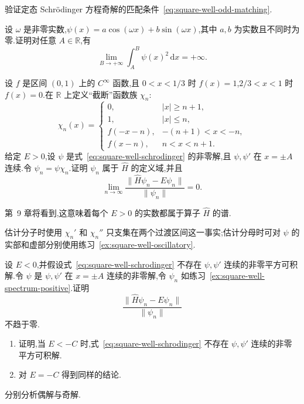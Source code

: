\begin{exercise}\label{ex:square-well-odd-matching}
验证定态 Schrödinger 方程奇解的匹配条件~\eqref{eq:square-well-odd-matching}.
\end{exercise}

\begin{exercise}\label{ex:square-well-oscillatory}
设 \(\omega\) 是非零实数,\(\psi(x)=a\cos(\omega x)+b\sin(\omega x)\),其中 \(a,b\) 为实数且不同时为零.证明对任意 \(A\in\mathbb{R}\),有
\[
\lim_{B\to+\infty}\int_{A}^{B}\psi(x)^{2}\,\mathrm{d}x=+\infty.
\]
\end{exercise}

\begin{exercise}\label{ex:square-well-spectrum-positive}
设 \(f\) 是区间 \((0,1)\) 上的 \(C^{\infty}\) 函数,且 \(0<x<1/3\) 时 \(f(x)=1\),\(2/3<x<1\) 时 \(f(x)=0\).在 \(\mathbb{R}\) 上定义“截断”函数族 \(\chi_{n}\):
\[
\chi_{n}(x)=
\begin{cases}
0,&|x|\ge n+1,\\
1,&|x|\le n,\\
f(-x-n),&-(n+1)<x<-n,\\
f(x-n),&n<x<n+1.
\end{cases}
\]
给定 \(E>0\),设 \(\psi\) 是式~\eqref{eq:square-well-schrodinger} 的非零解,且 \(\psi,\psi'\) 在 \(x=\pm A\) 连续.令 \(\psi_{n}=\psi\chi_{n}\).证明 \(\psi_{n}\) 属于 \(\widehat H\) 的定义域,并且
\[
\lim_{n\to\infty}\frac{\|\widehat H\psi_{n}-E\psi_{n}\|}{\|\psi_{n}\|}=0.
\]
\begin{note}
第~9 章将看到,这意味着每个 \(E>0\) 的实数都属于算子 \(\widehat H\) 的谱.
\end{note}
\begin{solution}
估计分子时使用 \(\chi_n'\) 和 \(\chi_n''\) 只支集在两个过渡区间这一事实;估计分母时可对 \(\psi\) 的实部和虚部分别使用练习~\ref{ex:square-well-oscillatory}.
\end{solution}
\end{exercise}

\begin{exercise}\label{ex:square-well-spectrum-negative}
设 \(E<0\),并假设式~\eqref{eq:square-well-schrodinger} 不存在 \(\psi,\psi'\) 连续的非零平方可积解.令 \(\psi\) 是 \(\psi,\psi'\) 在 \(x=\pm A\) 连续的非零解,令 \(\psi_n\) 如练习~\ref{ex:square-well-spectrum-positive}.证明
\[
\frac{\|\widehat H\psi_{n}-E\psi_{n}\|}{\|\psi_{n}\|}
\]
不趋于零.
\end{exercise}

\begin{exercise}\label{ex:square-well-no-low-states}
\begin{enumerate}
\item 证明,当 \(E<-C\) 时,式~\eqref{eq:square-well-schrodinger} 不存在 \(\psi,\psi'\) 连续的非零平方可积解.
\item 对 \(E=-C\) 得到同样的结论.
\end{enumerate}
\begin{note}
分别分析偶解与奇解.
\end{note}
\end{exercise}

